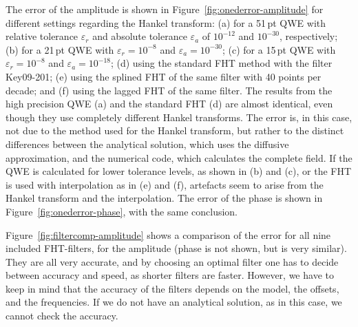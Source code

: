 \documentclass[paper]{geophysics}
\begin{document}
The error of the amplitude is shown in Figure~\ref{fig:onederror-amplitude} for
different settings regarding the Hankel transform: (a) for a 51\,pt QWE with
relative tolerance $\varepsilon_r$ and absolute tolerance $\varepsilon_a$ of
$10^{-12}$ and $10^{-30}$, respectively; (b) for a 21\,pt QWE with
$\varepsilon_r = 10^{-8}$ and $\varepsilon_a = 10^{-30}$; (c) for a 15\,pt QWE
with $\varepsilon_r = 10^{-8}$ and $\varepsilon_a = 10^{-18}$; (d) using the
standard FHT method with the filter Key09-201; (e) using the splined FHT of the
same filter with 40 points per decade; and (f) using the lagged FHT of the same
filter.
%
%
The results from the high precision QWE (a) and the standard FHT (d) are almost
identical, even though they use completely different Hankel transforms. The
error is, in this case, not due to the method used for the Hankel transform,
but rather to the distinct differences between the analytical solution, which
uses the diffusive approximation, and the numerical code, which calculates the
complete field. If the QWE is calculated for lower tolerance levels, as shown
in (b) and (c), or the FHT is used with interpolation as in (e) and (f),
artefacts seem to arise from the Hankel transform and the interpolation. The
error of the phase is shown in Figure~\ref{fig:onederror-phase}, with the same
conclusion.
%
%

Figure~\ref{fig:filtercomp-amplitude} shows a comparison of the error for all
nine included FHT-filters, for the amplitude (phase is not shown, but is very
similar). They are all very accurate, and by choosing an optimal filter one has
to decide between accuracy and speed, as shorter filters are faster. However,
we have to keep in mind that the accuracy of the filters depends on the model,
the offsets, and the frequencies. If we do not have an analytical solution, as
in this case, we cannot check the accuracy.
%
%
\end{document}
